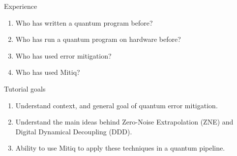 \documentclass[11pt,aspectratio=1610,xcolor=dvipsnames]{beamer}
\begin{document}
\begin{frame}{Experience}
	\begin{enumerate}[<+->]
		\item Who has written a quantum program before?
		\item Who has run a quantum program on hardware before?
		\item Who has used error mitigation?
		\item Who has used Mitiq?
	\end{enumerate}
\end{frame}

\begin{frame}{Tutorial goals}
	\begin{enumerate}
		\item Understand context, and general goal of quantum error mitigation.
		\item Understand the main ideas behind Zero-Noise Extrapolation (ZNE) and Digital Dynamical Decoupling (DDD).
		\item Ability to use Mitiq to apply these techniques in a quantum pipeline.
	\end{enumerate}
\end{frame}
\end{document}
